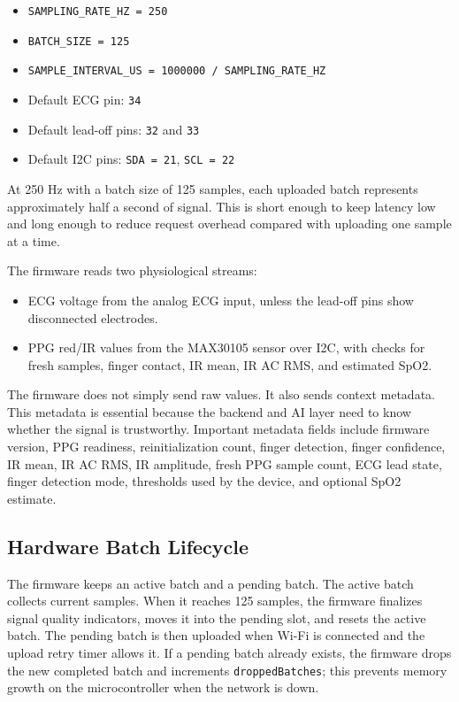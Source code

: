 \begin{itemize}
    \item \texttt{SAMPLING\_RATE\_HZ = 250}
    \item \texttt{BATCH\_SIZE = 125}
    \item \texttt{SAMPLE\_INTERVAL\_US = 1000000 / SAMPLING\_RATE\_HZ}
    \item Default ECG pin: \texttt{34}
    \item Default lead-off pins: \texttt{32} and \texttt{33}
    \item Default I2C pins: \texttt{SDA = 21}, \texttt{SCL = 22}
\end{itemize}

At 250 Hz with a batch size of 125 samples, each uploaded batch represents approximately half a second of signal. This is short enough to keep latency low and long enough to reduce request overhead compared with uploading one sample at a time.

The firmware reads two physiological streams:

\begin{itemize}
    \item ECG voltage from the analog ECG input, unless the lead-off pins show disconnected electrodes.
    \item PPG red/IR values from the MAX30105 sensor over I2C, with checks for fresh samples, finger contact, IR mean, IR AC RMS, and estimated SpO2.
\end{itemize}

The firmware does not simply send raw values. It also sends context metadata. This metadata is essential because the backend and AI layer need to know whether the signal is trustworthy. Important metadata fields include firmware version, PPG readiness, reinitialization count, finger detection, finger confidence, IR mean, IR AC RMS, IR amplitude, fresh PPG sample count, ECG lead state, finger detection mode, thresholds used by the device, and optional SpO2 estimate.

\subsection{Hardware Batch Lifecycle}

The firmware keeps an active batch and a pending batch. The active batch collects current samples. When it reaches 125 samples, the firmware finalizes signal quality indicators, moves it into the pending slot, and resets the active batch. The pending batch is then uploaded when Wi-Fi is connected and the upload retry timer allows it. If a pending batch already exists, the firmware drops the new completed batch and increments \texttt{droppedBatches}; this prevents memory growth on the microcontroller when the network is down.

